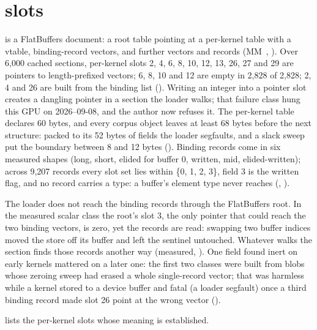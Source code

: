 \section{ slots}\label{sec:gpu-metadata-slots}

 is a FlatBuffers document: a root table pointing at a per-kernel table with a vtable,
binding-record vectors, and further vectors and records (MM~, ). Over 6,000 cached sections,
per-kernel slots 2, 4, 6, 8, 10, 12, 13, 26, 27 and 29 are pointers to length-prefixed vectors; 6, 8, 10 and 12 are empty
in 2,828 of 2,828; 2, 4 and 26 are built from the binding list (). Writing an integer into a
pointer slot creates a dangling pointer in a section the loader walks; that failure class hung this GPU on 2026–09-08,
and the author now refuses it. The per-kernel table declares 60 bytes, and every corpus object leaves at least 68
bytes before the next structure: packed to its 52 bytes of fields the loader segfaults, and a slack sweep put the
boundary between 8 and 12 bytes (). Binding records come in six measured shapes (long, short,
elided for buffer 0, written, mid, elided-written); across 9,207 records every slot set lies within \{0, 1, 2, 3\}, field 3
is the written flag, and no record carries a type: a buffer's element type never reaches 
(, ).

The loader does not reach the binding records through the FlatBuffers root. In the measured scalar class the root's slot 3, the
only pointer that could reach the two binding vectors, is zero, yet the records are read: swapping two buffer indices
moved the store off its buffer and left the sentinel untouched. Whatever walks the section finds those records another
way (measured, ). One field found inert on early kernels mattered on a later one: the
first two classes were built from blobs whose zeroing sweep had erased a whole single-record vector; that was harmless
while a kernel stored to a device buffer and fatal (a loader segfault) once a third binding record made slot 26 point at
the wrong vector ().

 lists the per-kernel slots whose meaning is established.

